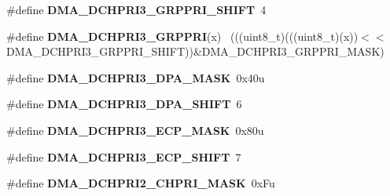 \begin{DoxyCompactItemize}
\item 
\hypertarget{group___d_m_a___register___masks_ga945f2b4e697b41ad7b92544b8ee67461}{}\#define {\bfseries D\+M\+A\+\_\+\+D\+C\+H\+P\+R\+I3\+\_\+\+G\+R\+P\+P\+R\+I\+\_\+\+S\+H\+I\+F\+T}~4\label{group___d_m_a___register___masks_ga945f2b4e697b41ad7b92544b8ee67461}

\item 
\hypertarget{group___d_m_a___register___masks_gad720562d914fbb294dcb4e3510c6e871}{}\#define {\bfseries D\+M\+A\+\_\+\+D\+C\+H\+P\+R\+I3\+\_\+\+G\+R\+P\+P\+R\+I}(x)                                    ~(((uint8\+\_\+t)(((uint8\+\_\+t)(x))$<$$<$D\+M\+A\+\_\+\+D\+C\+H\+P\+R\+I3\+\_\+\+G\+R\+P\+P\+R\+I\+\_\+\+S\+H\+I\+F\+T))\&D\+M\+A\+\_\+\+D\+C\+H\+P\+R\+I3\+\_\+\+G\+R\+P\+P\+R\+I\+\_\+\+M\+A\+S\+K)\label{group___d_m_a___register___masks_gad720562d914fbb294dcb4e3510c6e871}

\item 
\hypertarget{group___d_m_a___register___masks_gaef70570689d5f3d820526668a189e615}{}\#define {\bfseries D\+M\+A\+\_\+\+D\+C\+H\+P\+R\+I3\+\_\+\+D\+P\+A\+\_\+\+M\+A\+S\+K}~0x40u\label{group___d_m_a___register___masks_gaef70570689d5f3d820526668a189e615}

\item 
\hypertarget{group___d_m_a___register___masks_ga3efa0a806b45176edb7f736daf5ee774}{}\#define {\bfseries D\+M\+A\+\_\+\+D\+C\+H\+P\+R\+I3\+\_\+\+D\+P\+A\+\_\+\+S\+H\+I\+F\+T}~6\label{group___d_m_a___register___masks_ga3efa0a806b45176edb7f736daf5ee774}

\item 
\hypertarget{group___d_m_a___register___masks_gabb8c04abc8cce4060af92862f34ed168}{}\#define {\bfseries D\+M\+A\+\_\+\+D\+C\+H\+P\+R\+I3\+\_\+\+E\+C\+P\+\_\+\+M\+A\+S\+K}~0x80u\label{group___d_m_a___register___masks_gabb8c04abc8cce4060af92862f34ed168}

\item 
\hypertarget{group___d_m_a___register___masks_ga35828808080f8f51927f8731cf8be7bd}{}\#define {\bfseries D\+M\+A\+\_\+\+D\+C\+H\+P\+R\+I3\+\_\+\+E\+C\+P\+\_\+\+S\+H\+I\+F\+T}~7\label{group___d_m_a___register___masks_ga35828808080f8f51927f8731cf8be7bd}

\item 
\hypertarget{group___d_m_a___register___masks_gaa13f7f19a25ff7ec4c566803d9ab48b8}{}\#define {\bfseries D\+M\+A\+\_\+\+D\+C\+H\+P\+R\+I2\+\_\+\+C\+H\+P\+R\+I\+\_\+\+M\+A\+S\+K}~0x\+Fu\label{group___d_m_a___register___masks_gaa13f7f19a25ff7ec4c566803d9ab48b8}


\end{DoxyCompactItemize}
